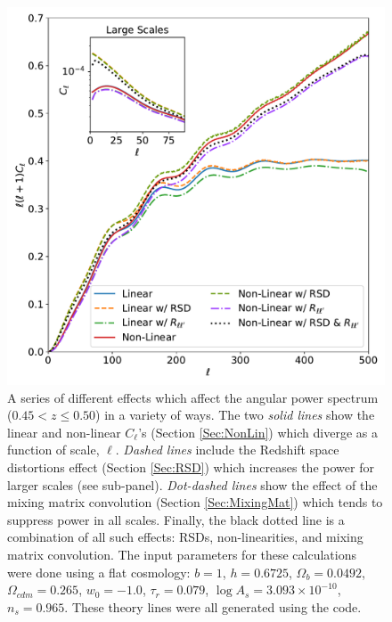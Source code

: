 \begin{figure}
\begin{center}
\includegraphics[width=\textwidth]{BOSS-FIGS/Cls-Comparison.pdf}
\caption[Different effects which affect the angular power spectrum modelled into \texttt{UCLCL}.]{A series of different effects which affect the angular power spectrum ($0.45 < z \leq 0.50$) in a variety of ways. The two \textit{solid lines} show the linear and non-linear $C_{\ell}$'s (Section \ref{Sec:NonLin}) which diverge as a function of scale, $\ell$. \textit{Dashed lines} include the Redshift space distortions effect (Section \ref{Sec:RSD}) which increases the power for larger scales (see sub-panel). \textit{Dot-dashed lines} show the effect of the mixing matrix convolution (Section \ref{Sec:MixingMat}) which tends to suppress power in all scales. Finally, the black dotted line is a combination of all such effects: RSDs, non-linearities, and mixing matrix convolution. The input parameters for these calculations were done using a flat cosmology: $b=1$, $h = 0.6725$, $\Omega_b = 0.0492$, $\Omega_{cdm} = 0.265$, $w_0=-1.0$, $\tau_r = 0.079$, $\log A_s = 3.093 \times 10^{-10}$, $n_s = 0.965$. These theory lines were all generated using the \uclcl code.}
\label{fig:Cl_Theory}
\end{center}
\end{figure}

